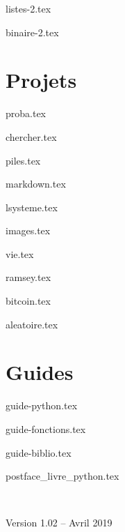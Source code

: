 \documentclass[10pt,twoside,openright]{report}
\begin{document}
{listes-2.tex}

{binaire-2.tex}


\clearemptydoublepage
\part{Projets}

{proba.tex}

{chercher.tex}

{piles.tex}

{markdown.tex}

{lsysteme.tex}

{images.tex}

{vie.tex}

{ramsey.tex}

{bitcoin.tex}

{aleatoire.tex}






\clearemptydoublepage
\part{Guides}

{guide-python.tex}

{guide-fonctions.tex}

{guide-biblio.tex}



\clearemptydoublepage


{postface_livre_python.tex}

\newpage

~
\vfill
\bigskip
\bigskip

\centerline{Version 1.02 -- Avril 2019}
\end{document}
